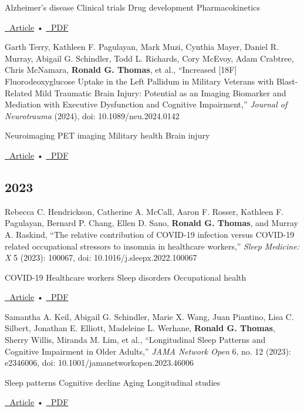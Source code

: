 \documentclass[
  letterpaper,
  DIV=11,
  numbers=noendperiod]{scrartcl}
\begin{document}
{Alzheimer's disease} {Clinical trials} {Drug development}
{Pharmacokinetics}

\href{https://doi.org/10.1186/s13195-024-01540-z}{🔗 Article} •
\href{https://doi.org/10.1186/s13195-024-01540-z}{📄 PDF}

Garth Terry, Kathleen F. Pagulayan, Mark Muzi, Cynthia Mayer, Daniel R.
Murray, Abigail G. Schindler, Todd L. Richards, Cory McEvoy, Adam
Crabtree, Chris McNamara, \textbf{Ronald G. Thomas}, et al., ``Increased
{[}18F{]} Fluorodeoxyglucose Uptake in the Left Pallidum in Military
Veterans with Blast-Related Mild Traumatic Brain Injury: Potential as an
Imaging Biomarker and Mediation with Executive Dysfunction and Cognitive
Impairment,'' \emph{Journal of Neurotrauma} (2024), doi:
10.1089/neu.2024.0142

{Neuroimaging} {PET imaging} {Military health} {Brain injury}

\href{https://doi.org/10.1089/neu.2024.0142}{🔗 Article} •
\href{https://doi.org/10.1089/neu.2024.0142}{📄 PDF}

\subsection{2023}\label{section-1}

Rebecca C. Hendrickson, Catherine A. McCall, Aaron F. Rosser, Kathleen
F. Pagulayan, Bernard P. Chang, Ellen D. Sano, \textbf{Ronald G.
Thomas}, and Murray A. Raskind, ``The relative contribution of COVID-19
infection versus COVID-19 related occupational stressors to insomnia in
healthcare workers,'' \emph{Sleep Medicine: X} 5 (2023): 100067, doi:
10.1016/j.sleepx.2022.100067

{COVID-19} {Healthcare workers} {Sleep disorders} {Occupational health}

\href{https://doi.org/10.1016/j.sleepx.2022.100067}{🔗 Article} •
\href{https://doi.org/10.1016/j.sleepx.2022.100067}{📄 PDF}

Samantha A. Keil, Abigail G. Schindler, Marie X. Wang, Juan Piantino,
Lisa C. Silbert, Jonathan E. Elliott, Madeleine L. Werhane,
\textbf{Ronald G. Thomas}, Sherry Willis, Miranda M. Lim, et al.,
``Longitudinal Sleep Patterns and Cognitive Impairment in Older
Adults,'' \emph{JAMA Network Open} 6, no. 12 (2023): e2346006, doi:
10.1001/jamanetworkopen.2023.46006

{Sleep patterns} {Cognitive decline} {Aging} {Longitudinal studies}

\href{https://doi.org/10.1001/jamanetworkopen.2023.46006}{🔗 Article} •
\href{https://doi.org/10.1001/jamanetworkopen.2023.46006}{📄 PDF}
\end{document}
